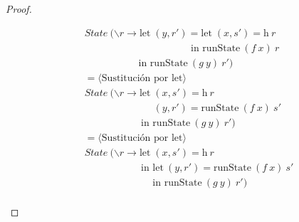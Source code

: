 \documentclass[a4paper,12pt]{article}
\begin{document}
\begin{proof}
\begin{fleqn}
\begin{equation}
\begin{split}
  & State \ (\backslash r \to \mbox{let} \; (y,r') = \mbox{let} \; (x,s') = \mbox{h} \ r \\
  & \hspace{128pt} \mbox{in  runState} \ (f \ x) \ r\\
  & \hspace{65pt} \mbox{in  runState} \ (g \ y) \ r' )\\
  & =\langle \mbox{Sustitución por let}  \rangle \\
  & State \ (\backslash r \to \mbox{let} \; (x,s') = \mbox{h} \ r \\
  & \hspace{83pt} (y,r') = \mbox{runState} \ (f \ x) \ s'\\
  & \hspace{68pt} \mbox{in  runState} \ (g \ y) \ r' )\\
  & =\langle \mbox{Sustitución por let}  \rangle \\
  & State \ (\backslash r \to \mbox{let} \; (x,s') = \mbox{h} \ r \\
  & \hspace{68pt} \mbox{in let} \ (y,r') = \mbox{runState} \ (f \ x) \ s'\\
  & \hspace{82pt} \mbox{in  runState} \ (g \ y) \ r' )\\
\end{split}
\end{equation}
\end{fleqn}


\end{proof}
\end{document}
